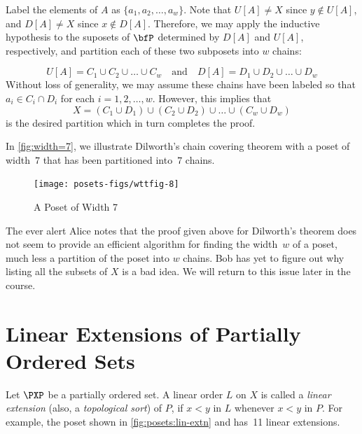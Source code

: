 Label the elements of $A$ as
$\{a_1,a_2,\dots,a_w\}$. Note
that $U[A]\ne X$ since $y\notin U[A]$, and $D[A]\ne X$ since
$x\notin D[A]$. Therefore, we may apply the inductive hypothesis to
the suposets of $\bfP$ determined by $D[A]$ and $U[A]$, respectively,
and partition each of these two subposets into $w$ chains: 

\[
U[A]= C_1\cup C_2\cup\dots\cup C_w\quad\text{and}\quad
 D[A]=D_1\cup D_2\cup\dots\cup D_w
\]
Without loss of generality, we may assume these chains have
been labeled so that $a_i\in C_i\cap D_i$ for each $i=1,2,\dots,w$. 
However, this implies that 
\[
X=(C_1\cup D_1)\cup (C_2\cup D_2)\cup\dots\cup(C_w\cup D_w)
\]
is the desired partition which in turn completes the proof.

In \autoref{fig:width=7}, we illustrate Dilworth's chain covering
theorem with a poset of width~$7$ that has been partitioned into~$7$
chains.

\begin{figure}
\begin{center}
\texttt{[image: posets-figs/wttfig-8]}
\caption{A Poset of Width 7}
\label{fig:width=7}
\end{center}
\end{figure}

\begin{remark}
The ever alert Alice notes that
the proof given above for Dilworth's theorem does not seem to provide
an efficient algorithm for finding the width~$w$ of a poset, much less
a partition of the poset into $w$ chains.  Bob has yet to figure out
why listing all the subsets of $X$ is a bad idea.  We will return to 
this issue later in the course.
\end{remark}

\section{Linear Extensions of Partially Ordered Sets}\label{s:posets:sorting}

Let $\PXP$ be a partially ordered set.  A linear order $L$ on $X$ is
called a \textit{linear extension} (also, a \textit{topological sort})
of $P$, if $x<y$ in $L$ whenever $x<y$ in $P$.  For example, the
poset shown in \autoref{fig:posets:lin-extn} and has~11 linear extensions.

